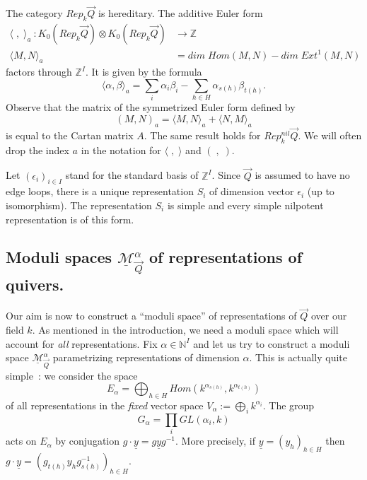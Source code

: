 \documentclass[a4paper,10pt]{amsart}
\def\Z{\mathbb{Z}}
\def\N{\mathbb{N}}
\def\a{\alpha}
\numberwithin{equation}{section}
\begin{document}
\vspace{.15in}

The category $Rep_k\vec{Q}$ is hereditary. The additive Euler form
\begin{align*}
\langle\;,\; \rangle_a~: K_0(Rep_k\vec{Q}) \otimes K_0(Rep_k\vec{Q})&\to \Z\\
\langle M, N \rangle_a &=dim\;Hom(M,N) - dim\; Ext^1(M,N)
\end{align*}
factors through $\Z^I$. It is given by the formula
\begin{equation}\label{E:10}
\langle \alpha, \beta \rangle_a =\sum_{i} \alpha_i \beta_i -\sum_{h \in H} \alpha_{s(h)}\beta_{t(h)}.
\end{equation}
Observe that the matrix of the symmetrized Euler form defined by 
$$(M,N)_a=\langle M,N\rangle_a + \langle N,M\rangle_a$$
is equal to the Cartan matrix $A$. The same result holds for $Rep^{nil}_k\vec{Q}$. We will often drop the index $a$ in the notation for $\langle\;,\;\rangle$ and $(\;,\;)$.

\vspace{.15in}

Let $(\epsilon_i)_{i \in I}$ stand for the standard basis of $\Z^I$. Since $\vec{Q}$ is assumed to have no edge loops, there is a unique representation $S_i$ of dimension vector $\epsilon_i$ (up to isomorphism). The representation $S_i$ is simple and every simple nilpotent representation is of this form.

\vspace{.3in}

\subsection{Moduli spaces $\underline{\mathcal{M}}^{\alpha}_{\vec{Q}}$ of representations of quivers.}

\vspace{.15in}

Our aim is now to construct a ``moduli space'' of representations of $\vec{Q}$ over our field $k$. As mentioned in the introduction,  we need a moduli space which will account for \textit{all} representations. Fix $\alpha \in \N^I$ and let us try to construct a moduli space $\underline{\mathcal{M}}^{\alpha}_{\vec{Q}}$ parametrizing representations of dimension $\alpha$. This is actually quite simple~: we consider the space
$$E_{\alpha}=\bigoplus_{h \in H} {Hom}(k^{\a_{s(h)}},k^{\a_{t(h)}})$$
of all representations in the \textit{fixed} vector space $V_{\alpha}:=\bigoplus_{i} k^{\a_i}$. The group
$$G_{\alpha}=\prod_i GL(\alpha_i,k)$$
acts on $E_{\alpha}$ by conjugation $g \cdot \underline{y}=g \underline{y} g^{-1}$. More precisely, if
$\underline{y}=(y_h)_{h \in H}$ then $g \cdot \underline{y}=(g_{t(h)} y_h g_{s(h)}^{-1})_{h \in H}$.
\end{document}
